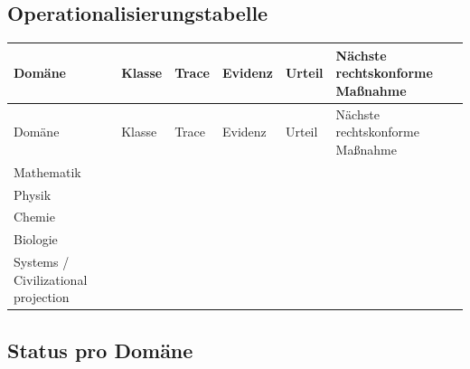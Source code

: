 \subsection{Operationalisierungstabelle}
\begin{longtable}{@{}L{0.16\textwidth}L{0.11\textwidth}L{0.13\textwidth}L{0.13\textwidth}L{0.10\textwidth}L{0.17\textwidth}@{}}
\toprule
Domäne & Klasse & Trace & Evidenz & Urteil & Nächste rechtskonforme Maßnahme \\
\midrule
\endfirsthead
\toprule
Domäne & Klasse & Trace & Evidenz & Urteil & Nächste rechtskonforme Maßnahme \\
\midrule
\endhead
Mathematik &  &  &  &  &  \\
Physik &  &  &  &  &  \\
Chemie &  &  &  &  &  \\
Biologie &  &  &  &  &  \\
Systems / Civilizational projection &  &  &  &  &  \\
\bottomrule
\end{longtable}

\subsection{Status pro Domäne}
